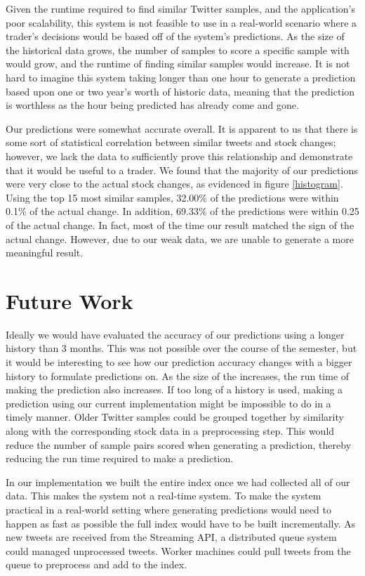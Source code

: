 \documentclass[twocolumn]{article}
\begin{document}
Given the runtime required to find similar Twitter samples, and the application’s poor scalability, this system is not feasible to use in a real-world scenario where a trader’s decisions would be based off of the system’s predictions. As the size of the historical data grows, the number of samples to score a specific sample with would grow, and the runtime of finding similar samples would increase. It is not hard to imagine this system taking longer than one hour to generate a prediction based upon one or two year’s worth of historic data, meaning that the prediction is worthless as the hour being predicted has already come and gone.

Our predictions were somewhat accurate overall. It is apparent to us that there is some sort of statistical correlation between similar tweets and stock changes; however, we lack the data to sufficiently prove this relationship and demonstrate that it would be useful to a trader. We found that the majority of our predictions were very close to the actual stock changes, as evidenced in figure \ref{histogram}. Using the top 15 most similar samples, 32.00\% of the predictions were within 0.1\% of the actual change. In addition, 69.33\% of the predictions were within 0.25 of the actual change. In fact, most of the time our result matched the sign of the actual change. However, due to our weak data, we are unable to generate a more meaningful result. 

\section{Future Work}
Ideally we would have evaluated the accuracy of our predictions using a longer history than 3 months. This was not possible over the course of the semester, but it would be interesting to see how our prediction accuracy changes with a bigger history to formulate predictions on. As the size of the increases, the run time of making the prediction also increases. If too long of a history is used, making a prediction using our current implementation might be impossible to do in a timely manner. Older Twitter samples could be grouped together by similarity along with the corresponding stock data in a preprocessing step. This would reduce the number of sample pairs scored when generating a prediction, thereby reducing the run time required to make a prediction.

In our implementation we built the entire index once we had collected all of our data. This makes the system not a real-time system. To make the system practical in a real-world setting where generating predictions would need to happen as fast as possible the full index would have to be built incrementally. As new tweets are received from the Streaming API, a distributed queue system could managed unprocessed tweets. Worker machines could pull tweets from the queue to preprocess and add to the index.
\end{document}
